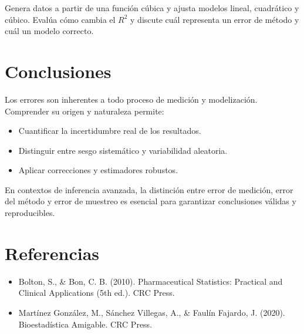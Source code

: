 \documentclass[
  spanish,
  letterpaper,
  DIV=11,
  numbers=noendperiod]{scrreprt}
\providecommand{\tightlist}{%
  \setlength{\itemsep}{0pt}\setlength{\parskip}{0pt}}
\begin{document}
Genera datos a partir de una función cúbica y ajusta modelos lineal,
cuadrático y cúbico. Evalúa cómo cambia el \(R^2\) y discute cuál
representa un error de método y cuál un modelo correcto.


\chapter{Conclusiones}\label{conclusiones}

Los errores son inherentes a todo proceso de medición y modelización.
Comprender su origen y naturaleza permite:

\begin{itemize}
\tightlist
\item
  Cuantificar la incertidumbre real de los resultados.
\item
  Distinguir entre sesgo sistemático y variabilidad aleatoria.
\item
  Aplicar correcciones y estimadores robustos.
\end{itemize}

En contextos de inferencia avanzada, la distinción entre error de
medición, error del método y error de muestreo es esencial para
garantizar conclusiones válidas y reproducibles.


\chapter*{Referencias}\label{referencias}


\protect{}\label{refs}

\begin{itemize}
\item
  Bolton, S., \& Bon, C. B. (2010). Pharmaceutical Statistics: Practical
  and Clinical Applications (5th ed.). CRC Press.
\item
  Martínez González, M., Sánchez Villegas, A., \& Faulín Fajardo, J.
  (2020). Bioestadística Amigable. CRC Press.
\end{itemize}
\end{document}
